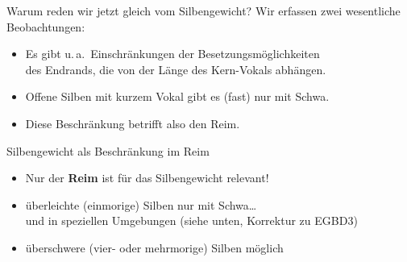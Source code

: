 \begin{frame}
  {Warum reden wir jetzt gleich vom Silbengewicht?}
  \pause
  Wir erfassen zwei wesentliche Beobachtungen:
  \pause
  \Zeile
  \begin{itemize}[<+->]
    \item Es gibt u.\,a.\ Einschränkungen der Besetzungsmöglichkeiten\\
      des \alert{Endrands}, die von der \alert{Länge des Kern-Vokals} abhängen.
    \item Offene Silben mit kurzem Vokal gibt es (fast) nur mit Schwa.
  \Zeile
\item Diese Beschränkung betrifft also den \alert{Reim}.
  \end{itemize} 
\end{frame}

\begin{frame}
  {Silbengewicht als Beschränkung im Reim}
  \pause
  \Halbzeile
  \begin{center}
  \end{center}
  \pause
  \Zeile
  \raggedright
  \begin{itemize}[<+->]
    \item \alert{Nur der \textbf{Reim} ist für das Silbengewicht relevant!}
    \item überleichte (einmorige) Silben nur mit Schwa\ldots\\
      und in speziellen Umgebungen (siehe unten, Korrektur zu EGBD3) \\
    \item überschwere (vier- oder mehrmorige) Silben  möglich
  \end{itemize}
\end{frame}


